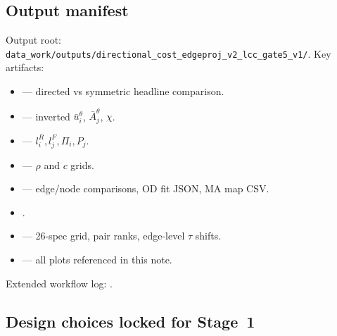 \documentclass[12pt]{article}
\newcommand{\ubar}{\bar u}
\newcommand{\Abar}{\bar A}
\begin{document}
\subsection{Output manifest}\label{sec:output_manifest}

Output root:
\texttt{data\_work/outputs/directional\_cost\_edgeproj\_v2\_lcc\_gate5\_v1/}.
Key artifacts:
\begin{itemize}[leftmargin=2em,itemsep=0.15em]
  \item {} --- directed vs symmetric headline comparison.
  \item {} --- inverted $\ubar_i^{\theta}$,
        $\Abar_j^{\theta}$, $\chi$.
  \item {} --- $l_i^R,l_j^F,\Pi_i,P_j$.
  \item {} --- $\rho$ and $c$ grids.
  \item {} --- edge/node comparisons, OD fit JSON, MA map CSV.
  \item {}.
  \item {} --- 26-spec grid, pair ranks, edge-level $\tau$ shifts.
  \item {} --- all plots referenced in this note.
\end{itemize}
Extended workflow log:
.

\subsection{Design choices locked for Stage~1}\label{sec:design_locks}
\end{document}
